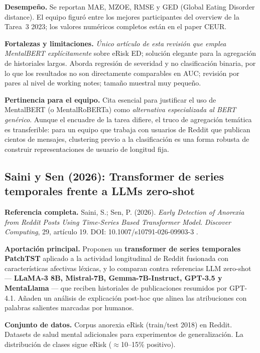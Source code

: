 \documentclass[journal]{IEEEtran}
\begin{document}
\textbf{Desempeño.} Se reportan MAE, MZOE, RMSE y GED (Global Eating Disorder distance). El equipo figuró entre los mejores participantes del overview de la Tarea~3 2023; los valores numéricos completos están en el paper CEUR.

\textbf{Fortalezas y limitaciones.} \emph{Único artículo de esta revisión que emplea MentalBERT explícitamente} sobre eRisk ED; solución elegante para la agregación de historiales largos. Aborda regresión de severidad y no clasificación binaria, por lo que los resultados no son directamente comparables en AUC; revisión por pares al nivel de working notes; tamaño muestral muy pequeño.

\textbf{Pertinencia para el equipo.} Cita esencial para justificar el uso de MentalBERT (o MentalRoBERTa) como \emph{alternativa especializada al BERT genérico}. Aunque el encuadre de la tarea difiere, el truco de agregación temática es transferible: para un equipo que trabaja con usuarios de Reddit que publican cientos de mensajes, clustering previo a la clasificación es una forma robusta de construir representaciones de usuario de longitud fija.

\subsection{Saini y Sen (2026): Transformer de series temporales frente a LLMs zero-shot}

\textbf{Referencia completa.} Saini, S.; Sen, P. (2026). \emph{Early Detection of Anorexia from Reddit Posts Using Time-Series Based Transformer Model}. \textit{Discover Computing}, 29, artículo 19. DOI: 10.1007/s10791-026-09903-3 \cite{saini2026patchtst}.

\textbf{Aportación principal.} Proponen un \textbf{transformer de series temporales PatchTST} aplicado a la actividad longitudinal de Reddit fusionada con características afectivas léxicas, y lo comparan contra referencias LLM zero-shot --- \textbf{LLaMA-3 8B, Mistral-7B, Gemma-7B-Instruct, GPT-3.5 y MentaLlama} --- que reciben historiales de publicaciones resumidos por GPT-4.1. Añaden un análisis de explicación post-hoc que alinea las atribuciones con palabras salientes marcadas por humanos.

\textbf{Conjunto de datos.} Corpus anorexia eRisk (train/test 2018) en Reddit. Datasets de salud mental adicionales para experimentos de generalización. La distribución de clases sigue eRisk ($\approx$10--15\% positivo).
\end{document}
